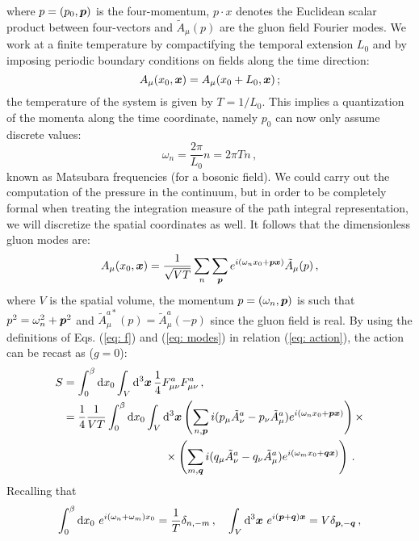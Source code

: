 \documentclass{article}
\begin{document}
where $p = (p_0, \vb*{p})$ is the four-momentum, $p \cdot x$ denotes the Euclidean scalar product between four-vectors and $\tilde{A}_\mu (p)$ are the gluon field Fourier modes.
We work at a finite temperature by compactifying the temporal extension $L_0$ and by imposing periodic boundary conditions on fields along the time direction:
\begin{equation}
    A_\mu (x_0, \vb*{x}) = A_\mu (x_0 + L_0, \vb*{x}) \, ;
\end{equation}
the temperature of the system is given by $T = 1/L_0$.
This implies a quantization of the momenta along the time coordinate, namely $p_0$ can now only assume discrete values:
\begin{equation}
    \omega_n = \frac{2\pi}{L_0} n = 2\pi T n \, ,
\end{equation}
known as Matsubara frequencies (for a bosonic field). We could carry out the computation of the pressure in the continuum, but in order 
to be completely formal when treating the integration measure of the path integral representation, we will discretize the 
spatial coordinates as well. It follows that the dimensionless gluon modes are:
\begin{equation}\label{eq: modes}
    A_\mu (x_0, \vb*{x}) = \frac{1}{\sqrt{VT}} \sum_n \sum_{\vb*{p}} e^{i(\omega_n x_0 + \vb*{p} \vb*{x})} \tilde{A}_\mu (p) \, , 
\end{equation} 
where $V$ is the spatial volume, the momentum $p = (\omega_n, \vb*{p})$ is such that $p^2 = \omega_n^2 + \vb*{p}^2$ and $\tilde{A}_\mu^{a*} (p) = \tilde{A}_\mu^a (-p)$ since the gluon field is real.
By using the definitions of Eqs. (\ref{eq: f}) and (\ref{eq: modes}) in relation (\ref{eq: action}), the action can be recast as ($g = 0$):
\begin{align*}
    S &= \int_{0}^{\beta} \dd{x_0} \int_V \dd[3]{\vb*{x}} \frac{1}{4} F_{\mu\nu}^a F_{\mu\nu}^a \, , \\
      &= \frac{1}{4} \frac{1}{VT} \int_{0}^{\beta} \dd{x_0} \int_V \dd[3]{\vb*{x}} \left(\sum_{n, \vb*{p}} i (p_\mu \tilde{A}_\nu^a - p_\nu \tilde{A}_\mu^a ) e^{i(\omega_n x_0 + \vb*{p} \vb*{x})} \right) \times \\
      &\qquad \qquad \qquad \qquad \quad \times \left(\sum_{m, \vb*{q}} i (q_\mu \tilde{A}_\nu^a - q_\nu \tilde{A}_\mu^a ) e^{i(\omega_m x_0 + \vb*{q} \vb*{x})} \right) \, .
\end{align*}
Recalling that
\begin{equation}
    \int_{0}^{\beta} \dd{x_0} \, e^{i(\omega_n + \omega_m)x_0} = \frac{1}{T} \delta_{n, -m} \, , \quad \int_V \dd[3]{\vb*{x}} \, e^{i(\vb*{p} + \vb*{q})\vb*{x}} = V \delta_{\vb*{p}, -\vb*{q}} \, ,
\end{equation}
\end{document}
